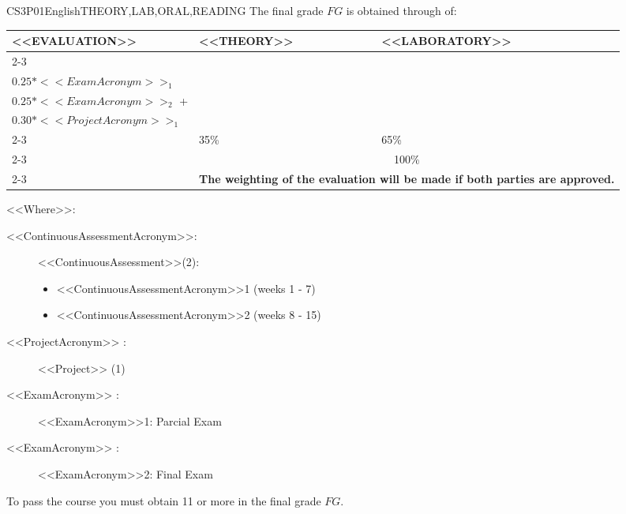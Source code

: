     \begin{evaluation}{CS3P01}{English}{THEORY,LAB,ORAL,READING}
    The final grade $FG$ is obtained through of:
   
    \begin{tabularx}{0.9\textwidth}{|X|p{}|p{}|} \hline
    \multirow{4}{*}{\uppercase{<<Evaluation>>}} & \uppercase{<<Theory>>} & \uppercase{<<Laboratory>>} \\ \cline{2-3}
    & %
        \begin{minipage}{0.95\textwidth}
        \begin{tabular}{l}
          $0.10*<<ContinuousAssessmentAcronym>>_{1}$  + \\
          $0.25*<<ExamAcronym>>_{1}$ 
        \end{tabular} 
        \end{minipage} 
    & %
        \begin{minipage}{0.95\textwidth}
        \begin{tabular}{l}
          $0.10*<<ContinuousAssessmentAcronym>>_{2}$  + \\
          $0.25*<<ExamAcronym>>_{2}$  +  \\
          $0.30*<<ProjectAcronym>>_{1}$
        \end{tabular} 
        \end{minipage}                 \\ \cline{2-3}
    
    & %
    35\% 
    & %
    65\% \\ \cline{2-3}
    & \multicolumn{2}{c|}{100\%}  \\ \cline{2-3}
    & \multicolumn{2}{c|}{\textbf{The weighting of the evaluation will be made if both parties are approved.}}  \\ \hline
    \end{tabularx}
     
    \vspace{2mm}
    \noindent <<Where>>:
    \begin{description}
        \item[<<ContinuousAssessmentAcronym>>:]<<ContinuousAssessment>>(2):
        \begin{itemize}
            \item <<ContinuousAssessmentAcronym>>1 (weeks 1 - 7) 
            \item <<ContinuousAssessmentAcronym>>2 (weeks 8 - 15)
        \end{itemize}
        \item[<<ProjectAcronym>> :] <<Project>> (1)
        \item[<<ExamAcronym>> :] <<ExamAcronym>>1: Parcial Exam
        \item[<<ExamAcronym>> :] <<ExamAcronym>>2: Final Exam
    \end{description}
   
    \noindent To pass the course you must obtain 11 or more in the final grade $FG$.
    \end{evaluation}


